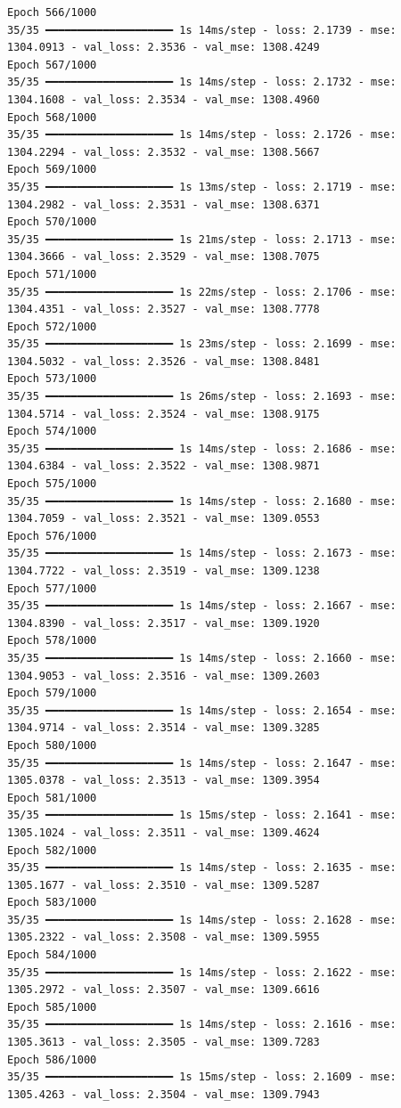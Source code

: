 \documentclass[
  letterpaper,
  DIV=11,
  numbers=noendperiod]{scrreprt}
\begin{document}
\begin{verbatim}
Epoch 566/1000
35/35 ━━━━━━━━━━━━━━━━━━━━ 1s 14ms/step - loss: 2.1739 - mse: 1304.0913 - val_loss: 2.3536 - val_mse: 1308.4249
Epoch 567/1000
35/35 ━━━━━━━━━━━━━━━━━━━━ 1s 14ms/step - loss: 2.1732 - mse: 1304.1608 - val_loss: 2.3534 - val_mse: 1308.4960
Epoch 568/1000
35/35 ━━━━━━━━━━━━━━━━━━━━ 1s 14ms/step - loss: 2.1726 - mse: 1304.2294 - val_loss: 2.3532 - val_mse: 1308.5667
Epoch 569/1000
35/35 ━━━━━━━━━━━━━━━━━━━━ 1s 13ms/step - loss: 2.1719 - mse: 1304.2982 - val_loss: 2.3531 - val_mse: 1308.6371
Epoch 570/1000
35/35 ━━━━━━━━━━━━━━━━━━━━ 1s 21ms/step - loss: 2.1713 - mse: 1304.3666 - val_loss: 2.3529 - val_mse: 1308.7075
Epoch 571/1000
35/35 ━━━━━━━━━━━━━━━━━━━━ 1s 22ms/step - loss: 2.1706 - mse: 1304.4351 - val_loss: 2.3527 - val_mse: 1308.7778
Epoch 572/1000
35/35 ━━━━━━━━━━━━━━━━━━━━ 1s 23ms/step - loss: 2.1699 - mse: 1304.5032 - val_loss: 2.3526 - val_mse: 1308.8481
Epoch 573/1000
35/35 ━━━━━━━━━━━━━━━━━━━━ 1s 26ms/step - loss: 2.1693 - mse: 1304.5714 - val_loss: 2.3524 - val_mse: 1308.9175
Epoch 574/1000
35/35 ━━━━━━━━━━━━━━━━━━━━ 1s 14ms/step - loss: 2.1686 - mse: 1304.6384 - val_loss: 2.3522 - val_mse: 1308.9871
Epoch 575/1000
35/35 ━━━━━━━━━━━━━━━━━━━━ 1s 14ms/step - loss: 2.1680 - mse: 1304.7059 - val_loss: 2.3521 - val_mse: 1309.0553
Epoch 576/1000
35/35 ━━━━━━━━━━━━━━━━━━━━ 1s 14ms/step - loss: 2.1673 - mse: 1304.7722 - val_loss: 2.3519 - val_mse: 1309.1238
Epoch 577/1000
35/35 ━━━━━━━━━━━━━━━━━━━━ 1s 14ms/step - loss: 2.1667 - mse: 1304.8390 - val_loss: 2.3517 - val_mse: 1309.1920
Epoch 578/1000
35/35 ━━━━━━━━━━━━━━━━━━━━ 1s 14ms/step - loss: 2.1660 - mse: 1304.9053 - val_loss: 2.3516 - val_mse: 1309.2603
Epoch 579/1000
35/35 ━━━━━━━━━━━━━━━━━━━━ 1s 14ms/step - loss: 2.1654 - mse: 1304.9714 - val_loss: 2.3514 - val_mse: 1309.3285
Epoch 580/1000
35/35 ━━━━━━━━━━━━━━━━━━━━ 1s 14ms/step - loss: 2.1647 - mse: 1305.0378 - val_loss: 2.3513 - val_mse: 1309.3954
Epoch 581/1000
35/35 ━━━━━━━━━━━━━━━━━━━━ 1s 15ms/step - loss: 2.1641 - mse: 1305.1024 - val_loss: 2.3511 - val_mse: 1309.4624
Epoch 582/1000
35/35 ━━━━━━━━━━━━━━━━━━━━ 1s 14ms/step - loss: 2.1635 - mse: 1305.1677 - val_loss: 2.3510 - val_mse: 1309.5287
Epoch 583/1000
35/35 ━━━━━━━━━━━━━━━━━━━━ 1s 14ms/step - loss: 2.1628 - mse: 1305.2322 - val_loss: 2.3508 - val_mse: 1309.5955
Epoch 584/1000
35/35 ━━━━━━━━━━━━━━━━━━━━ 1s 14ms/step - loss: 2.1622 - mse: 1305.2972 - val_loss: 2.3507 - val_mse: 1309.6616
Epoch 585/1000
35/35 ━━━━━━━━━━━━━━━━━━━━ 1s 14ms/step - loss: 2.1616 - mse: 1305.3613 - val_loss: 2.3505 - val_mse: 1309.7283
Epoch 586/1000
35/35 ━━━━━━━━━━━━━━━━━━━━ 1s 15ms/step - loss: 2.1609 - mse: 1305.4263 - val_loss: 2.3504 - val_mse: 1309.7943

\end{verbatim}
\end{document}
